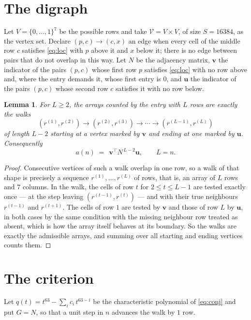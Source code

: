 \documentclass[11pt,a4paper]{article}
\theoremstyle{plain}
\newtheorem{lemma}[theorem]{Lemma}
\theoremstyle{definition}
\begin{document}
\section{The digraph}

Let $V=\{0,\dots,1\}^{7}$ be the possible rows and take
$\mathcal V=V\times V$, of size $S=16384$, as the vertex set. Declare $(p,c)\to(c,x)$ an edge
when every cell of the middle row $c$ satisfies \eqref{eq:loc} with $p$ above it and $x$
below it; there is no edge between pairs that do not overlap in this way. Let $N$ be the
adjacency matrix, $\mathbf{v}$ the indicator of the pairs $(p,c)$ whose first row $p$
satisfies \eqref{eq:loc} with no row above and, where the entry demands it, whose first entry is $0$, and $\mathbf{u}$ the indicator of
the pairs $(p,c)$ whose second row $c$ satisfies it with no row below.

\begin{lemma}\label{lem:walk}
For $L\ge2$, the arrays counted by the entry with $L$ rows are exactly the walks
\[
(r^{(1)},r^{(2)})\to(r^{(2)},r^{(3)})\to\cdots\to(r^{(L-1)},r^{(L)})
\]
of length $L-2$ starting at a vertex marked by $\mathbf{v}$ and ending at one marked by
$\mathbf{u}$. Consequently
\[
a(n)\;=\;\,\mathbf{v}^{\!\top}N^{\,L-2}\mathbf{u},\qquad L=n .
\]
\end{lemma}

\begin{proof}
Consecutive vertices of such a walk overlap in one row, so a walk of that shape is
precisely a sequence $r^{(1)},\dots,r^{(L)}$ of rows, that is, an array of $L$ rows
and $7$ columns. In the walk, the cells of row $t$ for $2\le t\le L-1$ are tested
exactly once --- at the step leaving $(r^{(t-1)},r^{(t)})$ --- and with their true
neighbours $r^{(t-1)}$ and $r^{(t+1)}$. The cells of row $1$ are tested by
$\mathbf{v}$ and those of row $L$ by $\mathbf{u}$, in both cases by the same condition
with the missing neighbour row treated as absent, which is how the array itself behaves at
its boundary. So the walks are exactly the admissible arrays, and summing over all starting
and ending vertices counts them.
\end{proof}

\section{The criterion}

Let $q(t)=t^{63}-\sum_i c_i\,t^{63-i}$ be the characteristic polynomial of
\eqref{eq:conj} and put $G=N$, so that a unit step in $n$ advances the walk by
$1$ row.
\end{document}
